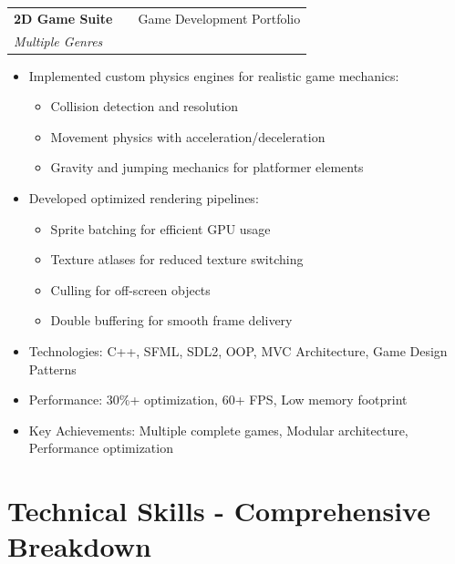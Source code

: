\documentclass[a4paper,12pt]{article}
\makeatletter
\newenvironment{projectdetailed}[3]
    {
    \begin{tabularx}{\linewidth}{@{}l X r@{}}
    \textbf{#1} & \hfill & #2 \\
    \textit{#3} & & \\[3.75pt]
    \end{tabularx}
    \begin{minipage}[t]{\linewidth}
    \begin{itemize}[nosep,after=\strut, leftmargin=1em, itemsep=2pt,label=--]
    }
    {
    \end{itemize}
    \end{minipage}
    \vspace{6pt}
    }
\makeatother
\begin{document}
\begin{projectdetailed}{2D Game Suite}{Game Development Portfolio}{Multiple Genres}
\begin{itemize}[nosep, leftmargin=2em]
    \item Tile-based world with scrolling camera
    \item Character movement and collision detection
    \item Basic combat system with turn-based mechanics
    \item Inventory system and item management
\end{itemize}
\item Implemented custom physics engines for realistic game mechanics:
\begin{itemize}[nosep, leftmargin=2em]
    \item Collision detection and resolution
    \item Movement physics with acceleration/deceleration
    \item Gravity and jumping mechanics for platformer elements
\end{itemize}
\item Developed optimized rendering pipelines:
\begin{itemize}[nosep, leftmargin=2em]
    \item Sprite batching for efficient GPU usage
    \item Texture atlases for reduced texture switching
    \item Culling for off-screen objects
    \item Double buffering for smooth frame delivery
\end{itemize}
\item Technologies: C++, SFML, SDL2, OOP, MVC Architecture, Game Design Patterns
\item Performance: 30\%+ optimization, 60+ FPS, Low memory footprint
\item Key Achievements: Multiple complete games, Modular architecture, Performance optimization
\end{projectdetailed}

\section{Technical Skills - Comprehensive Breakdown}
\end{document}
